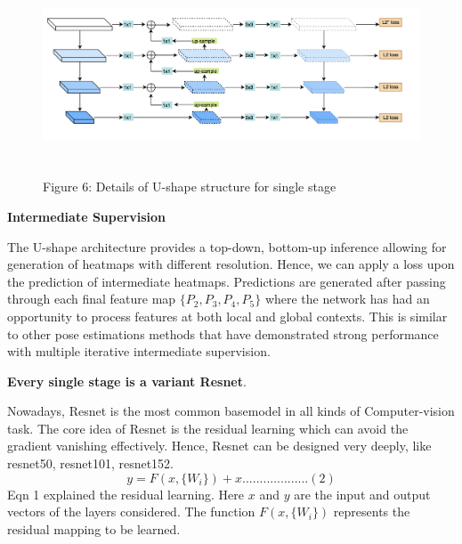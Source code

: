 \captionsetup[figure]{labelformat=empty}
\begin{figure}[htbp]
  \centering
  \includegraphics[width=16cm,height=6cm]{source/single-stage.png}
  \caption{Figure 6: Details of U-shape structure for single stage}
\end{figure}

\textbf{Intermediate Supervision}

The U-shape architecture provides a top-down, bottom-up inference allowing for generation of heatmaps with different resolution.
Hence, we can apply a loss upon the prediction of intermediate heatmaps.
Predictions are generated after passing through each final feature map $\{P_{2}, P_{3}, P_{4}, P_{5}\}$ where the network has had an opportunity to process features at both local and global contexts.
This is similar to other pose estimations methods that have demonstrated strong performance with multiple iterative intermediate supervision\cite{wei2016convolutional, carreira2016human}.

\textbf{Every single stage is a variant Resnet}.

Nowadays, Resnet\cite{he2016deep} is the most common basemodel in all kinds of Computer-vision task.
The core idea of Resnet is the residual learning which can avoid the gradient vanishing effectively.
Hence, Resnet can be designed very deeply, like resnet50, resnet101, resnet152.
\[ y = F(x, \{W_{i}\}) + x ...................(2)\]
Eqn 1 explained the residual learning. Here $x$ and $y$ are the input and output vectors of the layers considered.
The function $F(x, \{W_{i}\})$ represents the residual mapping to be learned.

